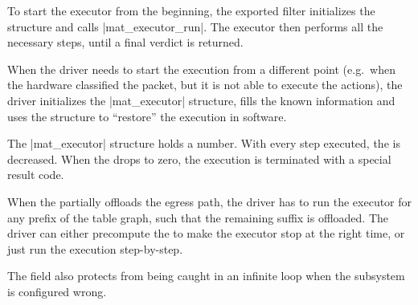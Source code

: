 To start the executor from the beginning, the exported  filter
initializes the structure and calls \fnc|mat_executor_run|. The executor
then performs all the necessary steps, until a final verdict is returned.

When the driver needs to start the execution from a different point (e.g.\ when
the hardware classified the packet, but it is not able to execute the actions),
the driver initializes the \struct|mat_executor| structure, fills the known
information and uses the structure to ``restore'' the execution in software.

The \struct|mat_executor| structure holds a  number. With every step
executed, the  is decreased. When the  drops to zero, the
execution is terminated with a special result code.

When the  partially offloads the egress path, the driver has to run the
executor for any prefix of the table graph, such that the remaining suffix is
offloaded. The driver can either precompute the  to make the executor
stop at the right time, or just run the execution step-by-step.

The  field also protects from being caught in an infinite loop when the
subsystem is configured wrong.
